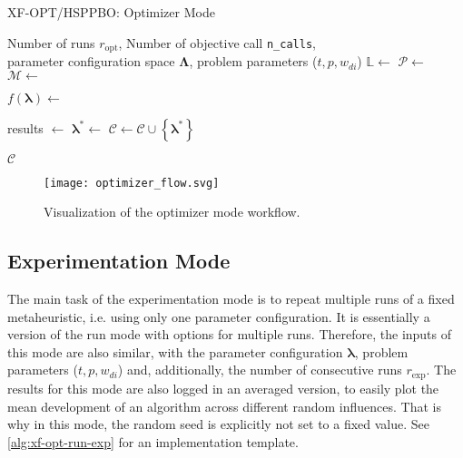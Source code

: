 \begin{algorithm}
	\caption{XF-OPT/HSPPBO: Optimizer Mode}
	\label{alg:xf-opt}
	\begin{algorithmic}
		\Require Number of runs $r_{\text{opt}}$, Number of objective call \texttt{n\_calls},\\ \quad parameter configuration space $\mathbf{\Lambda}$, problem parameters ($t, p, w_{di}$)
		\State $\mathbb{L}  \gets $  
		\State $\mathcal{P}  \gets $ 
		\State $\mathcal{M}  \gets $ 
		
		\State {}
		
		\State $f(\mathbf{\lambda}) \gets  $ 
		
		\State {}
		\State results $\gets $ 
		\State {}
		\State $\mathbf{\lambda}^* \gets$ 
		\State $\mathcal{C} \gets \mathcal{C} \cup \left\lbrace \mathbf{\lambda}^* \right\rbrace$
		
		\EndFor
		\State \Return $\mathcal{C}$
	\end{algorithmic}
\end{algorithm}

\begin{figure}
	\centering
	\texttt{[image: optimizer\_flow.svg]}
	\caption{Visualization of the optimizer mode workflow.}
	\label{fig:optimizer-flow}
\end{figure}

\subsection{Experimentation Mode}
\label{chap:exp-mode}

The main task of the experimentation mode is to repeat multiple runs of a fixed metaheuristic, i.e. using only one parameter configuration. It is essentially a version of the run mode with options for multiple runs. Therefore, the inputs of this mode are also similar, with the parameter configuration $\mathbf{\lambda}$, problem parameters ($t, p, w_{di}$) and, additionally, the number of consecutive runs $r_\text{exp}$. The results for this mode are also logged in an averaged version, to easily plot the mean development of an algorithm across different random influences. That is why in this mode, the random seed is explicitly not set to a fixed value. See \cref{alg:xf-opt-run-exp} for an implementation template.


